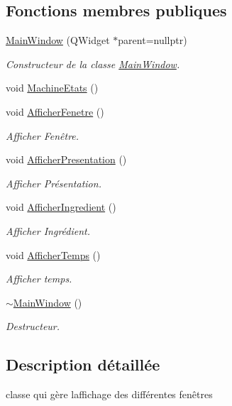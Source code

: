 \subsection*{Fonctions membres publiques}
\begin{DoxyCompactItemize}
\item 
\hyperlink{class_main_window_a996c5a2b6f77944776856f08ec30858d}{Main\+Window} (Q\+Widget $\ast$parent=nullptr)
\begin{DoxyCompactList}\small\item\em Constructeur de la classe \hyperlink{class_main_window}{Main\+Window}. \end{DoxyCompactList}\item 
void \hyperlink{class_main_window_a59cd9a83e43405ae1ad5c18e79b04db5}{Machine\+Etats} ()
\item 
void \hyperlink{class_main_window_aad6ceb17a20cccdc88050996600e9616}{Afficher\+Fenetre} ()
\begin{DoxyCompactList}\small\item\em Afficher Fenêtre. \end{DoxyCompactList}\item 
void \hyperlink{class_main_window_aeddbbb22621e412b4749d331c1d45001}{Afficher\+Presentation} ()
\begin{DoxyCompactList}\small\item\em Afficher Présentation. \end{DoxyCompactList}\item 
void \hyperlink{class_main_window_ad4059abf16eb904f988371b3791002bf}{Afficher\+Ingredient} ()
\begin{DoxyCompactList}\small\item\em Afficher Ingrédient. \end{DoxyCompactList}\item 
void \hyperlink{class_main_window_a33811a52abf8f1ce71ec4e150d9c9ac8}{Afficher\+Temps} ()
\begin{DoxyCompactList}\small\item\em Afficher temps. \end{DoxyCompactList}\item 
\hyperlink{class_main_window_ae98d00a93bc118200eeef9f9bba1dba7}{$\sim$\+Main\+Window} ()
\begin{DoxyCompactList}\small\item\em Destructeur. \end{DoxyCompactList}\end{DoxyCompactItemize}


\subsection{Description détaillée}
classe qui gère l\textquotesingle{}affichage des différentes fenêtres 

